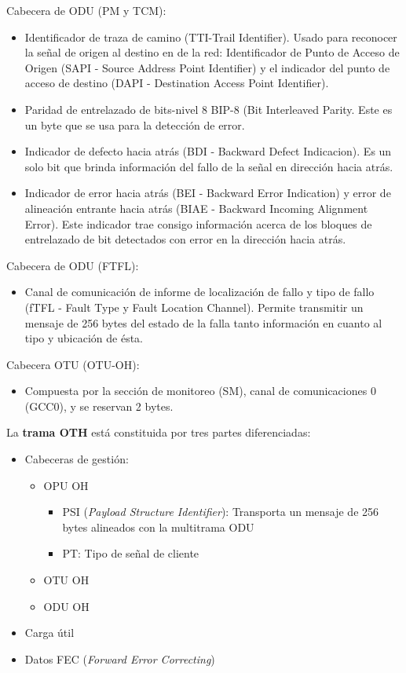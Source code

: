 \documentclass[10pt,portrait, twocolumn]{article}
\begin{document}
Cabecera de ODU (PM y TCM):

	\begin{itemize}
	\item Identificador de traza de camino (TTI-Trail Identifier). Usado para reconocer la señal de origen al destino en de la red: Identificador de Punto de Acceso de Origen (SAPI - Source Address Point Identifier) y el indicador del punto de acceso de destino (DAPI - Destination Access Point Identifier).
	\item Paridad de entrelazado de bits-nivel 8 BIP-8 (Bit Interleaved Parity. Este es un byte que se usa para la detección de error.
	\item Indicador de defecto hacia atrás (BDI - Backward Defect Indicacion). Es un solo bit que brinda información del fallo de la señal en dirección hacia atrás.
	\item Indicador de error hacia atrás (BEI - Backward Error Indication) y error de alineación entrante hacia atrás (BIAE - Backward Incoming Alignment Error). Este indicador trae consigo información acerca de los bloques de entrelazado de bit detectados con error en la dirección hacia atrás.
	\end{itemize}

Cabecera de ODU (FTFL):

	\begin{itemize}
	\item Canal de comunicación de informe de localización de fallo y tipo de fallo (fTFL - Fault Type y Fault Location Channel). Permite transmitir un mensaje de 256 bytes del estado de la falla tanto información en cuanto al tipo y ubicación de ésta.
	\end{itemize} 
	
Cabecera OTU (OTU-OH):

	\begin{itemize}
	\item Compuesta por la sección de monitoreo (SM), canal de comunicaciones 0 (GCC0), y se reservan 2 bytes.
	\end{itemize}

La \textbf{trama OTH} está constituida por tres partes diferenciadas:
	\begin{itemize}
	\item Cabeceras de gestión:
		\begin{itemize}
		\item OPU OH
			\begin{itemize}
			\item PSI (\textit{Payload Structure Identifier}): Transporta un mensaje de 256 bytes alineados con la multitrama ODU
			\item PT: Tipo de señal de cliente
			\end{itemize}
		\item OTU OH
		\item ODU OH
		\end{itemize}
	\item Carga útil
	\item Datos FEC (\textit{Forward Error Correcting})
	\end{itemize}
\end{document}
